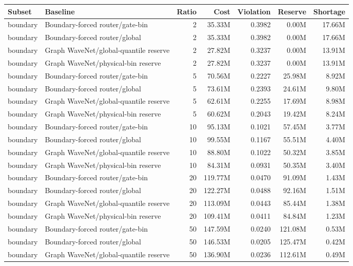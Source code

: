\begin{tabular}{llrrrrr}
\toprule
Subset & Baseline & Ratio & Cost & Violation & Reserve & Shortage \\
\midrule
boundary & Boundary-forced router/gate-bin & 2 & 35.33M & 0.3982 & 0.00M & 17.66M \\
boundary & Boundary-forced router/global & 2 & 35.33M & 0.3982 & 0.00M & 17.66M \\
boundary & Graph WaveNet/global-quantile reserve & 2 & 27.82M & 0.3237 & 0.00M & 13.91M \\
boundary & Graph WaveNet/physical-bin reserve & 2 & 27.82M & 0.3237 & 0.00M & 13.91M \\
boundary & Boundary-forced router/gate-bin & 5 & 70.56M & 0.2227 & 25.98M & 8.92M \\
boundary & Boundary-forced router/global & 5 & 73.61M & 0.2393 & 24.61M & 9.80M \\
boundary & Graph WaveNet/global-quantile reserve & 5 & 62.61M & 0.2255 & 17.69M & 8.98M \\
boundary & Graph WaveNet/physical-bin reserve & 5 & 60.62M & 0.2043 & 19.42M & 8.24M \\
boundary & Boundary-forced router/gate-bin & 10 & 95.13M & 0.1021 & 57.45M & 3.77M \\
boundary & Boundary-forced router/global & 10 & 99.55M & 0.1167 & 55.51M & 4.40M \\
boundary & Graph WaveNet/global-quantile reserve & 10 & 88.80M & 0.1022 & 50.32M & 3.85M \\
boundary & Graph WaveNet/physical-bin reserve & 10 & 84.31M & 0.0931 & 50.35M & 3.40M \\
boundary & Boundary-forced router/gate-bin & 20 & 119.77M & 0.0470 & 91.09M & 1.43M \\
boundary & Boundary-forced router/global & 20 & 122.27M & 0.0488 & 92.16M & 1.51M \\
boundary & Graph WaveNet/global-quantile reserve & 20 & 113.09M & 0.0443 & 85.44M & 1.38M \\
boundary & Graph WaveNet/physical-bin reserve & 20 & 109.41M & 0.0411 & 84.84M & 1.23M \\
boundary & Boundary-forced router/gate-bin & 50 & 147.59M & 0.0240 & 121.08M & 0.53M \\
boundary & Boundary-forced router/global & 50 & 146.53M & 0.0205 & 125.47M & 0.42M \\
boundary & Graph WaveNet/global-quantile reserve & 50 & 136.90M & 0.0236 & 112.61M & 0.49M \\

\end{tabular}
